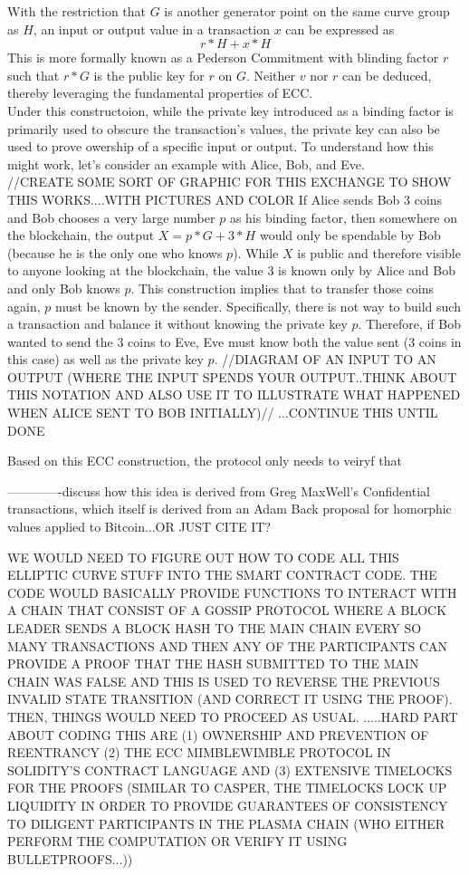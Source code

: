 \documentclass{amsart}
\theoremstyle{definition}
\numberwithin{equation}{section}
\begin{document}
With the restriction that $G$ is another generator point on the same curve group as $H$, an input or output value in a transaction $x$ can be expressed as\\
$$r*H + x*H$$
This is more formally known as a Pederson Commitment with blinding factor $r$ such that $r*G$ is the public key for $r$ on $G$. Neither $v$ nor $r$ can be deduced, thereby leveraging the fundamental properties of ECC.\\

Under this constructoion, while the private key introduced as a binding factor is primarily used to obscure the transaction's values, the private key can also be used to prove owership of a specific input or output. To understand how this might work, let's consider an example with Alice, Bob, and Eve. \\
//CREATE SOME SORT OF GRAPHIC FOR THIS EXCHANGE TO SHOW THIS WORKS....WITH PICTURES AND COLOR
If Alice sends Bob 3 coins and Bob chooses a very large number $p$ as his binding factor, then somewhere on the blockchain, the output $X = p*G + 3*H$ would only be spendable by Bob (because he is the only one who knows $p$). While $X$ is public and therefore visible to anyone looking at the blockchain, the value $3$ is known only by Alice and Bob and only Bob knows $p$. This construction implies that to transfer those coins again, $p$ must be known by the sender. Specifically, there is not way to build such a transaction and balance it without knowing the private key $p$. Therefore, if Bob wanted to send the 3 coins to Eve, Eve must know both the value sent (3 coins in this case) as well as the private key $p$.
//DIAGRAM OF AN INPUT TO AN OUTPUT (WHERE THE INPUT SPENDS YOUR OUTPUT..THINK ABOUT THIS NOTATION AND ALSO USE IT TO ILLUSTRATE WHAT HAPPENED WHEN ALICE SENT TO BOB INITIALLY)//
...CONTINUE THIS UNTIL DONE

Based on this ECC construction, the protocol only needs to veiryf that 

-------------discuss how this idea is derived from Greg MaxWell's Confidential transactions, which itself is derived from an Adam Back proposal for homorphic values applied to Bitcoin...OR JUST CITE IT?

WE WOULD NEED TO FIGURE OUT HOW TO CODE ALL THIS ELLIPTIC CURVE STUFF INTO THE SMART CONTRACT CODE. THE CODE WOULD BASICALLY PROVIDE FUNCTIONS TO INTERACT WITH A CHAIN THAT CONSIST OF A GOSSIP PROTOCOL WHERE A BLOCK LEADER SENDS A BLOCK HASH TO THE MAIN CHAIN EVERY SO MANY TRANSACTIONS AND THEN ANY OF THE PARTICIPANTS CAN PROVIDE A PROOF THAT THE HASH SUBMITTED TO THE MAIN CHAIN WAS FALSE AND THIS IS USED TO REVERSE THE PREVIOUS INVALID STATE TRANSITION (AND CORRECT IT USING THE PROOF). THEN, THINGS WOULD NEED TO PROCEED AS USUAL.
.....HARD PART ABOUT CODING THIS ARE (1) OWNERSHIP AND PREVENTION OF REENTRANCY (2) THE ECC MIMBLEWIMBLE PROTOCOL IN SOLIDITY'S CONTRACT LANGUAGE AND (3) EXTENSIVE TIMELOCKS FOR THE PROOFS (SIMILAR TO CASPER, THE TIMELOCKS LOCK UP LIQUIDITY IN ORDER TO PROVIDE GUARANTEES OF CONSISTENCY TO DILIGENT PARTICIPANTS IN THE PLASMA CHAIN (WHO EITHER PERFORM THE COMPUTATION OR VERIFY IT USING BULLETPROOFS...))
\end{document}

